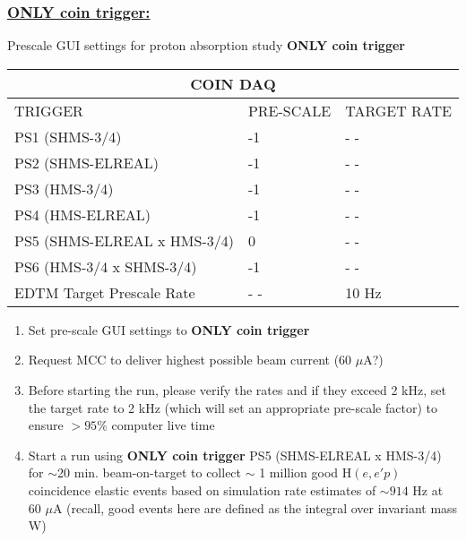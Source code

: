 \documentclass{article}
\begin{document}
\subsubsection*{\underline{ONLY coin trigger:}} 
    \begin{center}
    Prescale GUI settings for proton absorption study \textbf{ONLY coin trigger}
    \begin{tabular}{ |p{6cm}| |p{3cm}| |p{3cm}| }
    \hline
    \multicolumn{3}{|c|}{COIN DAQ} \\
    \hline
    TRIGGER & PRE-SCALE & TARGET RATE\\
    \hline
    PS1 (SHMS-3/4)    & -1  & - - \\
    PS2 (SHMS-ELREAL) &  -1  & - - \\
    PS3 (HMS-3/4)     & -1  & - -\\
    PS4 (HMS-ELREAL)  & -1  & - - \\
    PS5 (SHMS-ELREAL x HMS-3/4)  & 0 & - -  \\
    PS6 (HMS-3/4 x SHMS-3/4)     & -1 & - -  \\
    \hline
    EDTM Target Prescale Rate & - - & 10 Hz \\
    \hline
    \end{tabular}
    \end{center}
\begin{enumerate}
    \item Set pre-scale GUI settings to \textbf{ONLY coin trigger}
    \item Request MCC to deliver highest possible beam current (60 $\mu$A?)
    \item Before starting the run, please verify the rates and if they exceed 2 kHz, set the target rate to 2 kHz (which will set an appropriate pre-scale factor) to ensure $>95\%$ computer live time
    \item Start a run using \textbf{ONLY coin trigger} PS5 (SHMS-ELREAL x HMS-3/4) for $\sim$20 min. beam-on-target to collect $\sim$ 1 million good H$(e,e'p)$ coincidence elastic events based on simulation rate estimates of $\sim914$ Hz at 60 $\mu$A
    (recall, good events here are defined as the integral over invariant mass W)
\end{enumerate}      
    
\end{document}
